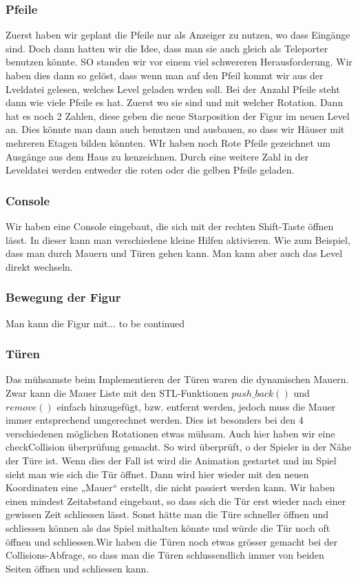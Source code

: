 \documentclass[12pt,a4paper]{scrartcl}
\begin{document}
\subsubsection{Pfeile}
Zuerst haben wir geplant die Pfeile nur als Anzeiger zu nutzen, wo dass Eingänge sind. Doch dann hatten wir die Idee, dass man sie auch gleich als Teleporter benutzen könnte. SO standen wir vor einem viel schwereren Herausforderung. Wir haben dies dann so gelöst, dass wenn man auf den Pfeil kommt wir aus der Lveldatei gelesen, welches Level geladen wrden soll. Bei der Anzahl Pfeile steht dann wie viele Pfeile es hat. Zuerst wo sie sind und mit welcher Rotation. Dann hat es noch 2 Zahlen, diese geben die neue Starposition der Figur im neuen Level an. Dies könnte man dann auch benutzen und ausbauen, so dass wir Häuser mit mehreren Etagen bilden könnten. WIr haben noch Rote Pfeile gezeichnet um Ausgänge aus dem Haus zu kenzeichnen. Durch eine weitere Zahl in der Leveldatei werden entweder die roten oder die gelben Pfeile geladen.

\subsubsection{Console}
Wir haben eine Console eingebaut, die sich mit der rechten Shift-Taste öffnen lässt. In dieser kann man verschiedene kleine Hilfen aktivieren. Wie zum Beispiel, dass man durch Mauern und Türen gehen kann. Man kann aber auch das Level direkt wechseln.

\subsubsection{Bewegung der Figur}
 Man kann die Figur mit... to be continued

\subsubsection{Türen}
Das mühsamste beim Implementieren der Türen waren die dynamischen Mauern. Zwar kann die Mauer Liste mit den
STL-Funktionen $push\_back()$ und $remove()$ einfach hinzugefügt, bzw. entfernt werden, jedoch muss die Mauer
immer entsprechend umgerechnet werden. Dies ist besonders bei den 4 verschiedenen möglichen Rotationen etwas mühsam.
Auch hier haben wir eine checkCollision überprüfung gemacht. So wird überprüft, o der Spieler in der Nähe der Türe ist. Wenn dies der Fall ist wird die Animation gestartet und im Spiel sieht man wie sich die Tür öffnet. Dann wird hier wieder mit den neuen Koordinaten eine „Mauer“ erstellt, die nicht passiert werden kann. Wir haben einen mindest Zeitabstand eingebaut, so dass sich die Tür erst wieder nach einer gewissen Zeit schliessen lässt. Sonst hätte man die Türe schneller öffnen  und schliessen können als das Spiel mithalten könnte und würde die Tür noch oft öffnen und schliessen.Wir haben die Türen noch etwas grösser gemacht bei der Collisions-Abfrage, so dass man die Türen schlussendlich immer von beiden Seiten öffnen und schliessen kann.
\end{document}
